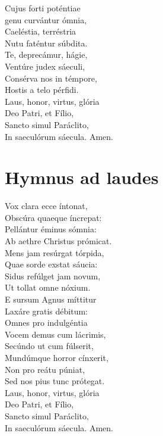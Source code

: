 \documentclass[a4paper, twoside, 12pt]{article}
\begin{document}
Cujus forti poténtiae\\
genu curvántur ómnia,\\
Caeléstia, terréstria\\
Nutu faténtur súbdita.\\

Te, deprecámur, hágie,\\
Ventúre judex sáeculi,\\
Consérva nos in témpore,\\
Hostis a telo pérfidi.\\ 	

Laus, honor, virtus, glória\\
Deo Patri, et Fílio,\\
Sancto simul Paráclito,\\
In saeculórum sáecula. Amen.

\section{Hymnus ad laudes}

Vox clara ecce íntonat,\\
Obscúra quaeque íncrepat:\\
Pellántur éminus sómnia:\\
Ab aethre Christus prómicat.\\ 	

Mens jam resúrgat tórpida,\\
Quae sorde exstat sáucia:\\
Sidus refúlget jam novum,\\
Ut tollat omne nóxium.\\

E sursum Agnus míttitur\\
Laxáre gratis débitum:\\
Omnes pro indulgéntia\\
Vocem demus cum lácrimis,\\ 	

Secúndo ut cum fúlserit,\\
Mundúmque horror cínxerit,\\
Non pro reátu púniat,\\
Sed nos pius tunc prótegat.\\ 	

Laus, honor, virtus, glória\\
Deo Patri, et Fílio,\\
Sancto simul Paráclito,\\
In saeculórum sáecula. Amen.
\end{document}
